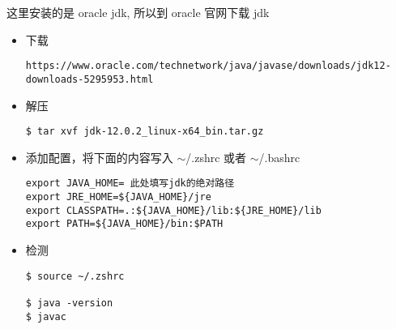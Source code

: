 \setlength\parindent{2em}这里安装的是 oracle jdk, 所以到 oracle 官网下载 jdk
\begin{itemize}
\item 下载
\begin{lstlisting}
https://www.oracle.com/technetwork/java/javase/downloads/jdk12-downloads-5295953.html
\end{lstlisting}


\item 解压
\begin{lstlisting}
$ tar xvf jdk-12.0.2_linux-x64_bin.tar.gz
\end{lstlisting}

\item 添加配置，将下面的内容写入 $ \sim $/.zshrc 或者 $ \sim $/.bashrc
\begin{lstlisting}
export JAVA_HOME= 此处填写jdk的绝对路径
export JRE_HOME=${JAVA_HOME}/jre
export CLASSPATH=.:${JAVA_HOME}/lib:${JRE_HOME}/lib
export PATH=${JAVA_HOME}/bin:$PATH
\end{lstlisting}

\item 检测 
\begin{lstlisting}
$ source ~/.zshrc 

$ java -version 
$ javac 
\end{lstlisting}
\end{itemize}
\newpage

